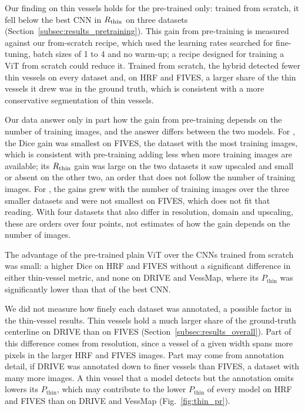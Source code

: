 Our finding on thin vessels holds for the pre-trained \medsam{} only: trained from scratch, it fell below the best CNN in $R_{\mathrm{thin}}$ on three datasets (Section~\ref{subsec:results_pretraining}). This gain from pre-training is measured against our from-scratch recipe, which used the learning rates searched for fine-tuning, batch sizes of 1 to 4 and no warm-up; a recipe designed for training a ViT from scratch could reduce it. Trained from scratch, the hybrid detected fewer thin vessels on every dataset and, on HRF and FIVES, a larger share of the thin vessels it drew was in the ground truth, which is consistent with a more conservative segmentation of thin vessels.

Our data answer only in part how the gain from pre-training depends on the number of training images, and the answer differs between the two models. For \medsam{}, the Dice gain was smallest on FIVES, the dataset with the most training images, which is consistent with pre-training adding less when more training images are available; its $R_{\mathrm{thin}}$ gain was large on the two datasets it saw upscaled and small or absent on the other two, an order that does not follow the number of training images. For \litemedsam{}, the gains grew with the number of training images over the three smaller datasets and were not smallest on FIVES, which does not fit that reading. With four datasets that also differ in resolution, domain and upscaling, these are orders over four points, not estimates of how the gain depends on the number of images.

The advantage of the pre-trained plain ViT over the CNNs trained from scratch was small: a higher Dice on HRF and FIVES without a significant difference in either thin-vessel metric, and none on DRIVE and VessMap, where its $P_{\mathrm{thin}}$ was significantly lower than that of the best CNN.

We did not measure how finely each dataset was annotated, a possible factor in the thin-vessel results. Thin vessels hold a much larger share of the ground-truth centerline on DRIVE than on FIVES (Section~\ref{subsec:results_overall}). Part of this difference comes from resolution, since a vessel of a given width spans more pixels in the larger HRF and FIVES images. Part may come from annotation detail, if DRIVE was annotated down to finer vessels than FIVES, a dataset with many more images. A thin vessel that a model detects but the annotation omits lowers its $P_{\mathrm{thin}}$, which may contribute to the lower $P_{\mathrm{thin}}$ of every model on HRF and FIVES than on DRIVE and VessMap (Fig.~\ref{fig:thin_pr}).

